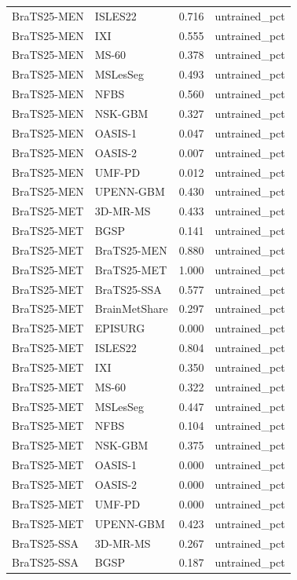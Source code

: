 \begin{tabular}{llrl}
BraTS25-MEN & ISLES22 & 0.716 & untrained\_pct \\
BraTS25-MEN & IXI & 0.555 & untrained\_pct \\
BraTS25-MEN & MS-60 & 0.378 & untrained\_pct \\
BraTS25-MEN & MSLesSeg & 0.493 & untrained\_pct \\
BraTS25-MEN & NFBS & 0.560 & untrained\_pct \\
BraTS25-MEN & NSK-GBM & 0.327 & untrained\_pct \\
BraTS25-MEN & OASIS-1 & 0.047 & untrained\_pct \\
BraTS25-MEN & OASIS-2 & 0.007 & untrained\_pct \\
BraTS25-MEN & UMF-PD & 0.012 & untrained\_pct \\
BraTS25-MEN & UPENN-GBM & 0.430 & untrained\_pct \\
BraTS25-MET & 3D-MR-MS & 0.433 & untrained\_pct \\
BraTS25-MET & BGSP & 0.141 & untrained\_pct \\
BraTS25-MET & BraTS25-MEN & 0.880 & untrained\_pct \\
BraTS25-MET & BraTS25-MET & 1.000 & untrained\_pct \\
BraTS25-MET & BraTS25-SSA & 0.577 & untrained\_pct \\
BraTS25-MET & BrainMetShare & 0.297 & untrained\_pct \\
BraTS25-MET & EPISURG & 0.000 & untrained\_pct \\
BraTS25-MET & ISLES22 & 0.804 & untrained\_pct \\
BraTS25-MET & IXI & 0.350 & untrained\_pct \\
BraTS25-MET & MS-60 & 0.322 & untrained\_pct \\
BraTS25-MET & MSLesSeg & 0.447 & untrained\_pct \\
BraTS25-MET & NFBS & 0.104 & untrained\_pct \\
BraTS25-MET & NSK-GBM & 0.375 & untrained\_pct \\
BraTS25-MET & OASIS-1 & 0.000 & untrained\_pct \\
BraTS25-MET & OASIS-2 & 0.000 & untrained\_pct \\
BraTS25-MET & UMF-PD & 0.000 & untrained\_pct \\
BraTS25-MET & UPENN-GBM & 0.423 & untrained\_pct \\
BraTS25-SSA & 3D-MR-MS & 0.267 & untrained\_pct \\
BraTS25-SSA & BGSP & 0.187 & untrained\_pct \\

\end{tabular}
